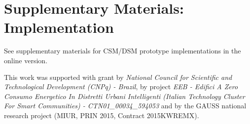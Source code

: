 \documentclass[format=acmsmall, review=false, screen=false]{acmart}
\begin{document}
	\section{Supplementary Materials: Implementation}	
	
	\begin{printonly}
	  See supplementary materials for CSM/DSM prototype implementations in the online version.
	\end{printonly}
	
	\begin{screenonly}
	
	
	  
	\end{screenonly}
	
	\begin{acks}
	
	This work was supported with grant by \textit{National Council for Scientific and Technological Development (CNPq) - Brazil},  by project \textit{EEB - Edifici A Zero Consumo Energetico In Distretti Urbani Intelligenti (Italian Technology Cluster For Smart Communities) - CTN01\_00034\_594053} and by the GAUSS national research project (MIUR, PRIN 2015, Contract 2015KWREMX).
	
	\end{acks}
	
	
	
	
\end{document}
